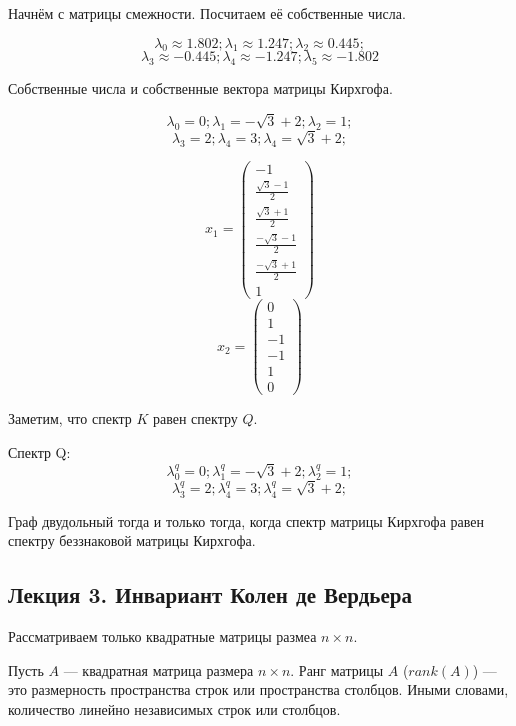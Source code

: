 \begin{example}
Начнём с матрицы смежности. Посчитаем её собственные числа.

$$\lambda_0 \approx 1.802; \lambda_1 \approx 1.247 ; \lambda_2 \approx 0.445; $$
$$\lambda_3 \approx -0.445; \lambda_4 \approx -1.247; \lambda_5 \approx -1.802$$

Собственные числа и собственные вектора матрицы Кирхгофа.

$$\lambda_0 =0; \lambda_1 = -\sqrt{3} + 2; \lambda_2 = 1; $$
$$\lambda_3 = 2; \lambda_4 = 3; \lambda_4 = \sqrt{3} + 2; $$


$$x_1 = \left(\begin{array}{c}-1 \\ \frac{\sqrt{3}-1}{2} \\ \frac{\sqrt{3}+1}{2} \\ \frac{-\sqrt{3}-1}{2} \\ \frac{-\sqrt{3}+1}{2} \\ 1 \end{array}\right)$$
$$x_2 = \left(\begin{array}{c}0\\1\\-1\\-1\\1\\0\end{array}\right)$$


Заметим, что спектр $K$ равен спектру $Q$.

Спектр Q:
$$\lambda^q_0 =0; \lambda^q_1 = -\sqrt{3} + 2; \lambda^q_2 = 1; $$
$$\lambda^q_3 = 2; \lambda^q_4 = 3; \lambda^q_4 = \sqrt{3} + 2; $$


\end{example}


\begin{theorem}
Граф двудольный тогда и только тогда, когда спектр матрицы Кирхгофа равен спектру беззнаковой матрицы Кирхгофа.
\end{theorem}

\subsection{Лекция 3. Инвариант Колен де Вердьера}

Рассматриваем только квадратные матрицы размеа $n \times n$.

\begin{definition}
Пусть $A$ --- квадратная матрица размера $n \times n$. Ранг матрицы $A$ ($rank(A)$) --- это размерность пространства строк или пространства столбцов. Иными словами, количество линейно независимых строк или столбцов.
\end{definition}

